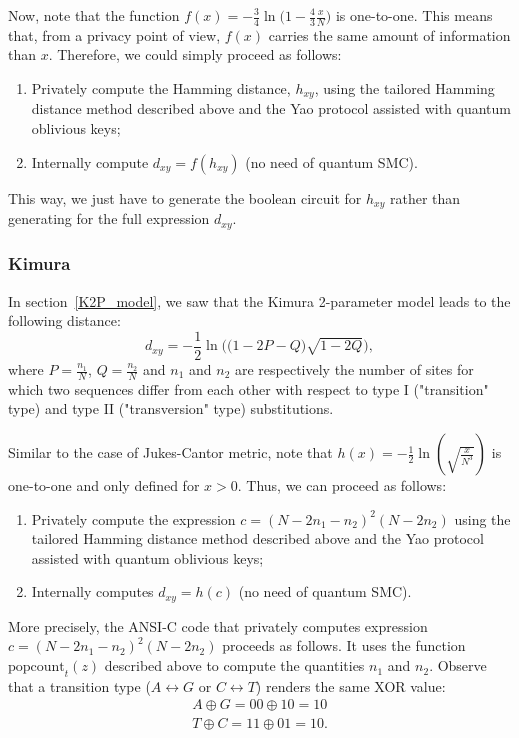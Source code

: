 Now, note that the function $f(x) = -\frac{3}{4} \ln \Big(1- \frac{4}{3}\frac{x}{N}\Big)$ is one-to-one. This means that, from a privacy point of view, $f(x)$ carries the same amount of information than $x$. Therefore, we could simply proceed as follows:

\begin{enumerate}
    \item Privately compute the Hamming distance, $h_{xy}$, using the tailored Hamming distance method described above and the Yao protocol assisted with quantum oblivious keys;
    \item Internally compute $d_{xy} = f(h_{xy})$ (no need of quantum SMC).
\end{enumerate}

This way, we just have to generate the boolean circuit for $h_{xy}$ rather than generating for the full expression $d_{xy}$.


\subsubsection{Kimura}
In section~\ref{K2P_model}, we saw that the Kimura 2-parameter model leads to the following distance:
$$d_{xy} = -\frac{1}{2}\ln\bigg( \big(1-2P-Q\big) \sqrt{1-2Q} \bigg),$$
where $P=\frac{n_1}{N}$, $Q=\frac{n_2}{N}$ and $n_1$ and $n_2$ are respectively the number of sites for which two sequences differ from each other with respect to type I ("transition" type) and type II ("transversion" type) substitutions.

Similar to the case of Jukes-Cantor metric, note that $h(x) = -\frac{1}{2}\ln(\sqrt{\frac{x}{N^3}})$ is one-to-one and only defined for $x>0$. Thus, we can proceed as follows:

\begin{enumerate}
    \item Privately compute the expression $c = (N-2n_1-n_2)^2(N-2n_2)$ using the tailored Hamming distance method described above and the Yao protocol assisted with quantum oblivious keys;
    
    \item Internally computes $d_{xy} = h(c)$ (no need of quantum SMC).
\end{enumerate}

More precisely, the ANSI-C code that privately computes expression $c = (N-2n_1-n_2)^2(N-2n_2)$ proceeds as follows. It uses the function $\text{popcount}_t(z)$ described above to compute the quantities $n_1$ and $n_2$. Observe that a transition type ($A\leftrightarrow G$ or $C\leftrightarrow T$) renders the same XOR value:
\begin{eqnarray*}
A \oplus G = 00 \oplus 10 = 10  \\
T \oplus C = 11 \oplus 01 = 10 .  
\end{eqnarray*}

